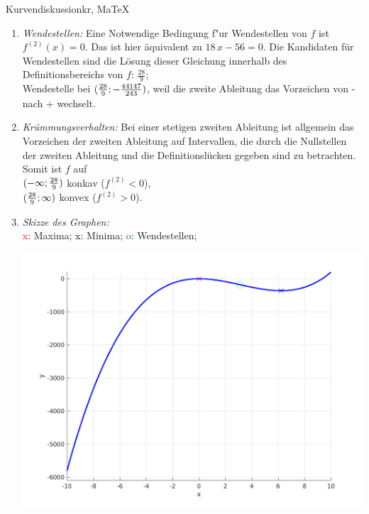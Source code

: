 \begin{MAufgabe}{Kurvendiskussion}{kr, MaTeX}
\begin{enumerate}
 $\MoIl-\infty\MIntvlSep0\MoIr$ monoton wachsend, \\ 
 $\MoIl0\MIntvlSep\frac{56}{9}\MoIr$ monoton  fallend, \\ 
 $\MoIl\frac{56}{9}\MIntvlSep \infty\MoIr$ monoton wachsend. \\ 
 \item \emph{Wendestellen:} 
 Eine Notwendige Bedingung f"ur Wendestellen von $f$ ist $f^{(2)}(x)=0$. 
 Das ist hier \"aquivalent zu $18\, x - 56=0$. 
 Die Kandidaten f\"ur Wendestellen sind die L\"osung dieser Gleichung innerhalb des Definitionsbereichs von $f$: $\frac{28}{9}$; \\ 
 Wendestelle bei $(\frac{28}{9};- \frac{44147}{243})$, weil die zweite Ableitung das Vorzeichen von - nach + wechselt. \\ 
 \item \emph{Kr\"ummungsverhalten:} 
 Bei einer stetigen zweiten Ableitung ist allgemein das Vorzeichen der zweiten Ableitung auf Intervallen, die durch die Nullstellen der zweiten Ableitung und die Definitionsl\"ucken gegeben sind zu betrachten. 
 Somit ist $f$ auf \\ 
 $(-\infty ;\frac{28}{9})$  konkav ($f^{(2)}<0$), \\ 
 $(\frac{28}{9}; \infty)$  konvex ($f^{(2)}>0$). \\ 
 \item \emph{Skizze des Graphen:} \\ 
 {\textcolor{red} x}: Maxima; {\textcolor{black} x}: Minima; {\textcolor{green} o}: Wendestellen; 
  \begin{center}
  \includegraphics[width=0.8\linewidth]{Abb_zur_Ag_autogenerated_fractions_22.png} \end{center}
  
 \end{enumerate}
 \else\relax\fi
  \end{MAufgabe}